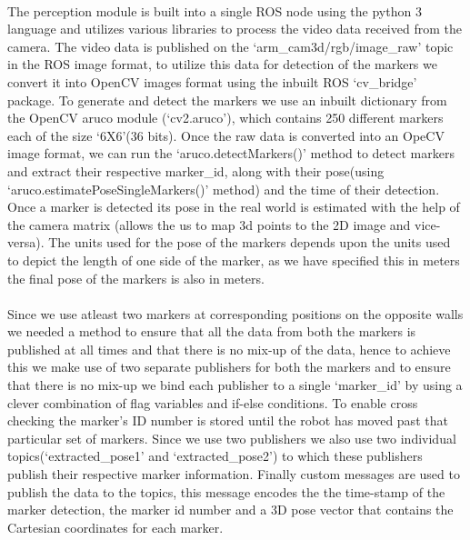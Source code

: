 \paragraph{} The perception module is built into a single ROS node using the python 3 language and utilizes various libraries to process the video data received from the camera. The video data is published on the `arm\_cam3d/rgb/image\_raw' topic in the ROS image format, to utilize this data for detection of the markers we convert it into OpenCV images format using the inbuilt ROS `cv\_bridge' package. To generate and detect the markers we use an inbuilt dictionary from the OpenCV aruco module (`cv2.aruco'), which contains 250 different markers each of the size `6X6'(36 bits). Once the raw data is converted into an OpeCV image format, we can run the `aruco.detectMarkers()' method to detect markers and extract their respective marker\_id, along with their pose(using `aruco.estimatePoseSingleMarkers()' method) and the time of their detection. Once a marker is detected its pose in the real world is estimated with the help of the camera matrix (allows the us to map 3d points to the 2D image and vice-versa). The units used for the pose of the markers depends upon the units used to depict the length of one side of the marker, as we have specified this in meters the final pose of the markers is also in meters.

\paragraph{} Since we use atleast two markers at corresponding positions on the opposite walls we needed a method to ensure that all the data from both the markers is published at all times and that there is no mix-up of the data, hence to achieve this we make use of two separate publishers for both the markers and to ensure that there is no mix-up we bind each publisher to a single `marker\_id' by using a clever combination of flag variables and if-else conditions. To enable cross checking the marker's ID number is stored until the robot has moved past that particular set of markers. Since we use two publishers we also use two individual topics(`extracted\_pose1' and `extracted\_pose2') to which these publishers publish their respective marker information. Finally custom messages are used to publish the data to the topics, this message encodes the the time-stamp of the marker detection, the marker id number and a 3D pose vector that contains the Cartesian coordinates for each marker.


